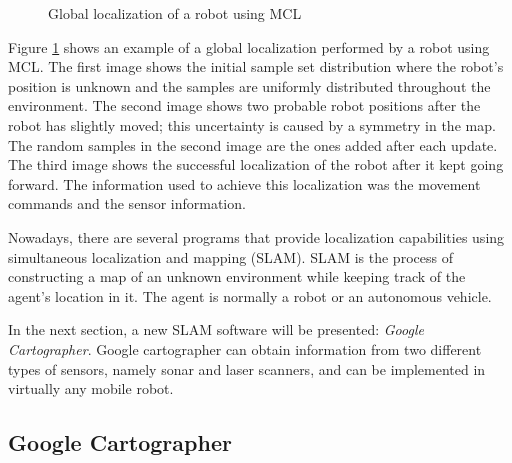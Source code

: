 \begin{figure}[H]
	\centering
	\begin{subfigure}[][Initialization]
		{\texttt{[image: position1.png]}}
	\end{subfigure}
	\begin{subfigure}[][Uncertainty due to symmetry]
		{\label{subfig:goal}
		\texttt{[image: position2.png]}}
	\end{subfigure}
	\begin{subfigure}[][Final localization]
		{\label{subfig:goal}
		\texttt{[image: position3.png]}}
	\end{subfigure}
	\vspace{-12pt}
	\caption{Global localization of a robot using MCL}
	\vspace{-15pt}
	\label{fig:example}
\end{figure}
\vspace{-8pt}

Figure \ref{fig:example} shows an example of a global localization performed by a robot using MCL. The first image shows the initial sample set distribution where the robot's position is unknown and the samples are uniformly distributed throughout the environment. The second image shows two probable robot positions after the robot has slightly moved; this uncertainty is caused by a symmetry in the map. The random samples in the second image are the ones added after each update. The third image shows the successful localization of the robot after it kept going forward. The information used to achieve this localization was the movement commands and the sensor information.

Nowadays, there are several programs that provide localization capabilities using simultaneous localization and mapping (SLAM). SLAM is the process of constructing a map of an unknown environment while keeping track of the agent's location in it. The agent is normally a robot or an autonomous vehicle.

In the next section, a new SLAM software will be presented: \textit{Google Cartographer}. Google cartographer can obtain information from two different types of sensors, namely sonar and laser scanners, and can be implemented in virtually any mobile robot.

\subsection{Google Cartographer}

